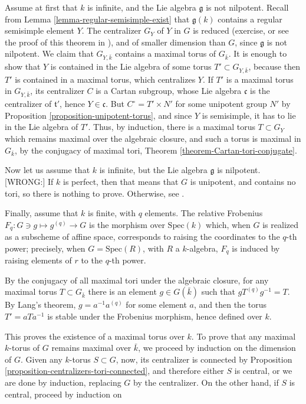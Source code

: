  Assume at first that $k$ is infinite, and the Lie algebra $\mathfrak g$ is not nilpotent.
  Recall from Lemma \ref{lemma-regular-semisimple-exist} that $\mathfrak g(k)$ contains a regular semisimple element $Y$. The centralizer $G_Y$ of $Y$ in $G$ is reduced (exercise, or see the proof of this theorem in \cite[Theorem 18.2]{Borel-LAG}), and of smaller dimension than $G$, since $\mathfrak g$ is not nilpotent. We claim that $G_{Y,\bar k}$ contains a maximal torus of $G_{\bar k}$. It is enough to show that $Y$ is contained in the Lie algebra of some torus $T'\subset G_{Y,\bar k}$, because then $T'$ is contained in a maximal torus, which centralizes $Y$. If $T'$ is a maximal torus in $G_{Y,\bar k}$, its centralizer $C$ is a Cartan subgroup, whose Lie algebra $\mathfrak c$ is the centralizer of $\mathfrak t'$, hence $Y\in \mathfrak c$. But $C^\circ=T'\times N'$ for some unipotent group $N'$ by Proposition \ref{proposition-unipotent-torus}, and since $Y$ is semisimple, it has to lie in the Lie algebra of $T'$. Thus, by induction, there is a maximal torus $T\subset G_Y$ which remains maximal over the algebraic closure, and such a torus is maximal in $G_{\bar k}$, by the conjugacy of maximal tori, Theorem \ref{theorem-Cartan-tori-conjugate}.
 

 Now let us assume that $k$ is infinite, but the Lie algebra $\mathfrak g$ is nilpotent. [WRONG:] If $k$ is perfect, then that means that $G$ is unipotent, and contains no tori, so there is nothing to prove. Otherwise, see \cite[17.8 and 18.2]{Borel-LAG}.
 
 Finally, assume that $k$ is finite, with $q$ elements. The relative Frobenius $F_q:G\ni g \mapsto g^{(q)} \to G$ is the morphism over $\text{Spec}(k)$ which, when $G$ is realized as a subscheme of affine space, corresponds to raising the coordinates to the $q$-th power; precisely, when $G=\text{Spec}(R)$, with $R$ a $k$-algebra, $F_q$ is induced by raising elements of $r$ to the $q$-th power. 
 
 By the conjugacy of all maximal tori under the algebraic closure, for any maximal torus $T\subset G_{\bar k}$ there is an element $g\in G(\bar k)$ such that $g T^{(q)} g^{-1} = T$. By Lang's theorem, $g=a^{-1} a^{(q)}$ for some element $a$, and then the torus $T' = aTa^{-1}$ is stable under the Frobenius morphism, hence defined over $k$.
 
 This proves the existence of a maximal torus over $k$. To prove that any maximal $k$-torus of $G$ remains maximal over $\bar k$, we proceed by induction on the dimension of $G$. Given any $k$-torus $S\subset G$, now, its centralizer is connected by Proposition \ref{proposition-centralizers-tori-connected}, and therefore either $S$ is central, or we are done by induction, replacing $G$ by the centralizer. On the other hand, if $S$ is central, proceed by induction on 
